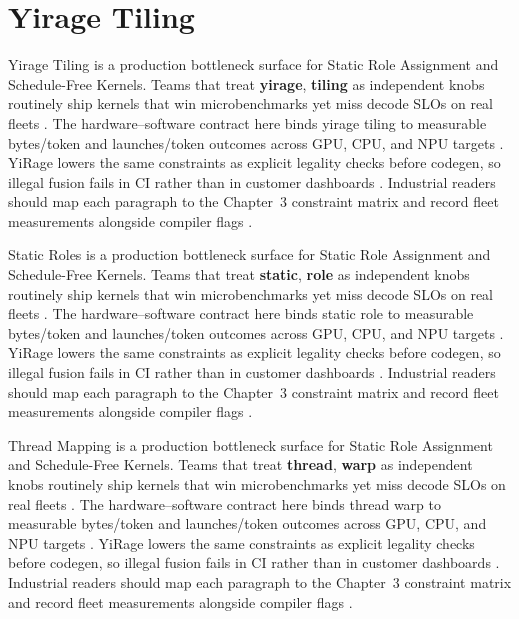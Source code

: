\section{Yirage Tiling}
\label{sec:yirage_tiling}

Yirage Tiling is a production bottleneck surface for Static Role Assignment and Schedule-Free Kernels. Teams that treat \textbf{yirage}, \textbf{tiling} as independent knobs routinely ship kernels that win microbenchmarks yet miss decode SLOs on real fleets \citep{nvidia2022hopper,amd2024aie}. The hardware--software contract here binds yirage tiling to measurable bytes/token and launches/token outcomes across GPU, CPU, and NPU targets \citep{semianalysis2024tma,dlbook}. YiRage lowers the same constraints as explicit legality checks before codegen, so illegal fusion fails in CI rather than in customer dashboards \citep{amd2024xdna,dao2022flashattention}. Industrial readers should map each paragraph to the Chapter~3 constraint matrix and record fleet measurements alongside compiler flags \citep{amd2024aie,kwon2023vllm}.

Static Roles is a production bottleneck surface for Static Role Assignment and Schedule-Free Kernels. Teams that treat \textbf{static}, \textbf{role} as independent knobs routinely ship kernels that win microbenchmarks yet miss decode SLOs on real fleets \citep{taxbreak2026,semianalysis2024tma}. The hardware--software contract here binds static role to measurable bytes/token and launches/token outcomes across GPU, CPU, and NPU targets \citep{memoryfloor2026,amd2024xdna}. YiRage lowers the same constraints as explicit legality checks before codegen, so illegal fusion fails in CI rather than in customer dashboards \citep{nvidia2022hopper,amd2024aie}. Industrial readers should map each paragraph to the Chapter~3 constraint matrix and record fleet measurements alongside compiler flags \citep{semianalysis2024tma,dlbook}.

Thread Mapping is a production bottleneck surface for Static Role Assignment and Schedule-Free Kernels. Teams that treat \textbf{thread}, \textbf{warp} as independent knobs routinely ship kernels that win microbenchmarks yet miss decode SLOs on real fleets \citep{memoryfloor2026,amd2024xdna}. The hardware--software contract here binds thread warp to measurable bytes/token and launches/token outcomes across GPU, CPU, and NPU targets \citep{nvidia2022hopper,amd2024aie}. YiRage lowers the same constraints as explicit legality checks before codegen, so illegal fusion fails in CI rather than in customer dashboards \citep{semianalysis2024tma,dlbook}. Industrial readers should map each paragraph to the Chapter~3 constraint matrix and record fleet measurements alongside compiler flags \citep{amd2024xdna,dao2022flashattention}.

